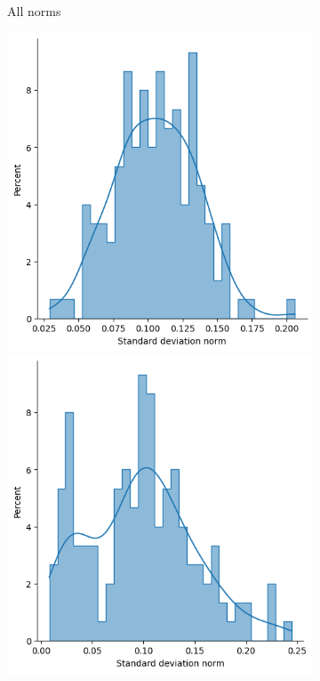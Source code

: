 \begin{figure}[htb]
\begin{subfigure}[t]{\textwidth+20pt\relax}
            \caption{All norms}\label{fig:normstdairplane1}
          \end{subfigure}\hfill
          \begin{subfigure}[t]{0.315\textwidth}
            \includegraphics[width=\textwidth]{figures/dropcon/matched_max_std_norms.png}
            \includegraphics[width=\textwidth]{figures/dropout/matched_max_std_norms.png}

\end{subfigure}
\end{figure}
